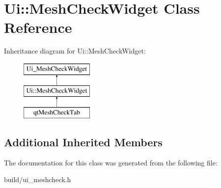 \hypertarget{class_ui_1_1_mesh_check_widget}{}\section{Ui\+:\+:Mesh\+Check\+Widget Class Reference}
\label{class_ui_1_1_mesh_check_widget}
Inheritance diagram for Ui\+:\+:Mesh\+Check\+Widget\+:\begin{figure}[H]
\begin{center}
\leavevmode
\includegraphics[height=3.000000cm]{class_ui_1_1_mesh_check_widget}
\end{center}
\end{figure}
\subsection*{Additional Inherited Members}


The documentation for this class was generated from the following file\+:\begin{DoxyCompactItemize}
\item 
build/ui\+\_\+meshcheck.\+h\end{DoxyCompactItemize}
